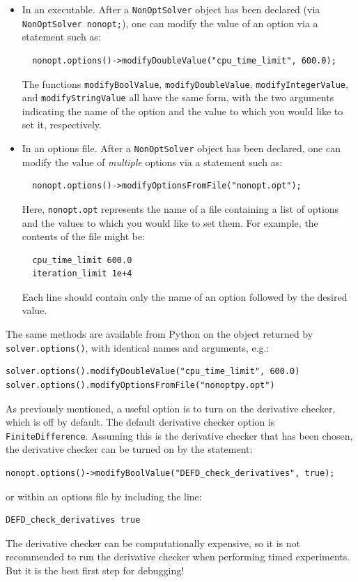 \documentclass{article}
\begin{document}
\begin{itemize}
  \item In an executable.  After a \texttt{NonOptSolver} object has been declared (via \texttt{NonOptSolver nonopt;}), one can modify the value of an option via a statement such as:
  \begin{verbatim}
  nonopt.options()->modifyDoubleValue("cpu_time_limit", 600.0);
  \end{verbatim}
  The functions \texttt{modifyBoolValue}, \texttt{modifyDoubleValue}, \texttt{modifyIntegerValue}, and \texttt{modifyStringValue} all have the same form, with the two arguments indicating the name of the option and the value to which you would like to set it, respectively.
  \item In an options file. After a \texttt{NonOptSolver} object has been declared, one can modify the value of \emph{multiple} options via a statement such as:
  \begin{verbatim}
  nonopt.options()->modifyOptionsFromFile("nonopt.opt");
  \end{verbatim}
  Here, \texttt{nonopt.opt} represents the name of a file containing a list of options and the values to which you would like to set them.  For example, the contents of the file might be:
  \begin{verbatim}
  cpu_time_limit 600.0
  iteration_limit 1e+4
  \end{verbatim}
  Each line should contain only the name of an option followed by the desired value.
\end{itemize}

The same methods are available from Python on the object returned by \texttt{solver.options()}, with identical names and arguments, e.g.:
\begin{verbatim}
solver.options().modifyDoubleValue("cpu_time_limit", 600.0)
solver.options().modifyOptionsFromFile("nonoptpy.opt")
\end{verbatim}

As previously mentioned, a useful option is to turn on the derivative checker, which is off by default. The default derivative checker option is \texttt{FiniteDifference}. Assuming this is the derivative checker that has been chosen, the derivative checker can be turned on by the statement:
\begin{verbatim}
nonopt.options()->modifyBoolValue("DEFD_check_derivatives", true);
\end{verbatim}
or within an options file by including the line:
\begin{verbatim}
DEFD_check_derivatives true
\end{verbatim}
The derivative checker can be computationally expensive, so it is not recommended to run the derivative checker when performing timed experiments. But it is the best first step for debugging!
\end{document}

